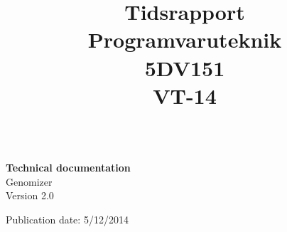 \title{Tidsrapport \\ 
	Programvaruteknik \\5DV151\\
	VT-14 }
	\begin{titlepage}
		\thispagestyle{empty}
		\begin{large}
			\begin{tabular}{@{}p{\textwidth}@{}}
			\end{tabular}
		\end{large}
		\vspace{35mm}
		\begin{center}
			\Huge{\textbf{Technical documentation}\\ Genomizer} \\
			\vspace{10mm}
			\LARGE{Version 2.0} \\
           \vspace{5mm}
           
            Publication date: 5/12/2014 \\
            

			\vspace{70mm}
            
			\begin{normalsize}				
			\end{normalsize}
		\end{center}
	\end{titlepage}